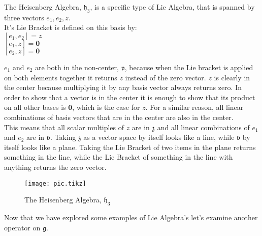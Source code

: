 \documentclass[11 pt]{article}
\newcommand{\fg}{\mathfrak{g}}
\newcommand{\fz}{\mathfrak{z}}
\newcommand{\fv}{\mathfrak{v}}
\newcommand{\fh}{\mathfrak{h}}
\newcommand{\zvec}{\mathbf{0}}
\begin{document}
\begin{example}
    The Heisenberg Algebra, $\fh_3$,  is a specific type of Lie Algebra, that
    is spanned by three vectors $e_1, e_2, z$.
    \\It's Lie Bracket is defined on this basis by:
    \\$[e_1, e_2] = z$
    \\$[e_1, z] = \zvec$
    \\$[e_2, z] = \zvec$
\end{example}

$e_1$ and $e_2$ are both in the non-center, $\fv$, because when the Lie bracket
is applied on both elements together it returns $z$ instead of the zero
vector.  $z$ is clearly in the center because multiplying it by any basis
vector always returns zero.  In order to show that a vector is in the center
it is enough to show that its product on all other bases is $\zvec$, which is
the case for $z$.  For a similar reason, all linear combinations of basis
vectors that are in the center are also in the center.\\

This means that all scalar multiples of $z$ are in $\fz$ and all linear
combinations of $e_1$ and $e_2$ are in $\fv$. Taking $\fz$ as a vector space
by itself looks like a line, while $\fv$ by itself looks like a plane.
Taking the Lie Bracket of two items in the plane returns something in the
line, while the Lie Bracket of something in the line with anything returns
the zero vector.

\begin{figure}[h]
    \centering
    \texttt{[image: pic.tikz]} %
        \label{fig:pic} %
    \caption{\footnotesize The Heisenberg Algebra, $\fh_3$} %
\end{figure}

Now that we have explored some examples of Lie Algebra's let's examine another
operator on $\fg$.

\pagebreak
\end{document}
